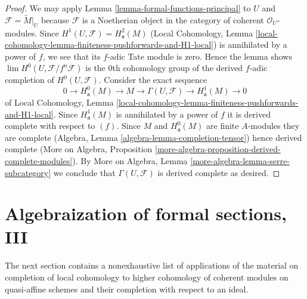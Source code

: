\begin{proof}
We may apply
Lemma \ref{lemma-formal-functions-principal}
to $U$ and $\mathcal{F} = \widetilde{M}|_U$
because $\mathcal{F}$ is a Noetherian object in
the category of coherent $\mathcal{O}_U$-modules.
Since $H^1(U, \mathcal{F}) = H^2_\mathfrak a(M)$
(Local Cohomology, Lemma
\ref{local-cohomology-lemma-finiteness-pushforwards-and-H1-local})
is annihilated by a power of $f$, we see that
its $f$-adic Tate module is zero.
Hence the lemma shows $\lim H^0(U, \mathcal{F}/f^n \mathcal{F})$
is the $0$th cohomology group of the
derived $f$-adic completion of $H^0(U, \mathcal{F})$.
Consider the exact sequence
$$
0 \to H^0_\mathfrak a(M) \to M \to
\Gamma(U, \mathcal{F}) \to H^1_\mathfrak a(M) \to 0
$$
of Local Cohomology, Lemma
\ref{local-cohomology-lemma-finiteness-pushforwards-and-H1-local}.
Since $H^1_\mathfrak a(M)$ is annihilated by a power of $f$
it is derived complete with respect to $(f)$.
Since $M$ and $H^0_\mathfrak a(M)$ are finite $A$-modules
they are complete
(Algebra, Lemma \ref{algebra-lemma-completion-tensor})
hence derived complete
(More on Algebra,
Proposition \ref{more-algebra-proposition-derived-complete-modules}).
By More on Algebra, Lemma \ref{more-algebra-lemma-serre-subcategory}
we conclude that $\Gamma(U, \mathcal{F})$ is derived complete
as desired.
\end{proof}







\section{Algebraization of formal sections, III}
\label{section-algebraization-sections-coherent-III}

\noindent
The next section contains a nonexhaustive list of
applications of the material
on completion of local cohomology to higher cohomology
of coherent modules on quasi-affine schemes and their
completion with respect to an ideal.

